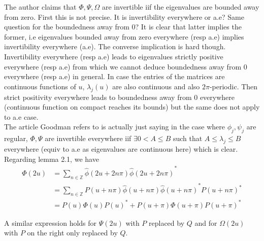 \documentclass[a4paper, 11pt]{article}
\begin{document}
The author claims that $\Phi, \Psi, \Omega$ are invertible iif the eigenvalues are bounded away from zero. First this is 
not precise. It is invertibility everywhere or a.e? Same question for the boundedness away from 0? It is clear that 
latter implies the former, i.e eigenvalues bounded away from zero everywhere (resp a.e) implies invertibility everywhere 
(a.e). The converse implication is hard though. Invertibility everywhere (resp a.e) leads to eigenvalues strictly 
positive everywhere (resp a.e) from which we cannot deduce boundedness away from 0 everywhere (resp a.e) in general. In 
case the entries of the matrices are continuous functions of $u$, $\lambda_j(u)$ are also continuous and also
$2\pi$-periodic. Then strict positivity everywhere leads to boundedness away from 0 everywhere (continuous function on 
compact reaches its bounds) but the same does not apply to a.e case.  \\

The article Goodman refers to is actually just saying in the case where $\phi_j, \psi_j$ are regular, $\Phi, \Psi$ are 
invertible everywhere iif $\exists 0 < A \leq B$ such that $A \leq \lambda_j \leq B$ everywhere (equiv to a.e as 
eigenvalues are continuous here) which is clear. \\

Regarding lemma 2.1, we have
\begin{align*}
  \Phi(2u) &= \sum_{n \in \mathbb{Z}} \hat{\phi}(2u+2n\pi) {\hat{\phi}(2u+2n\pi)}^* \\
  &= \sum_{n \in \mathbb{Z}} P(u+n\pi) \hat{\phi}(u+n\pi) {\hat{\phi}(u+n\pi)}^* {P(u+n\pi)}^* \\
  &= P(u) \Phi(u) {P(u)}^* + P(u+\pi) \Phi(u+\pi) {P(u+\pi)}^*
\end{align*}

A similar expression holds for $\Psi(2u)$ with $P$ replaced  by $Q$ and for $\Omega(2u)$ with $P$ on the right only 
replaced by $Q$.
\end{document}
